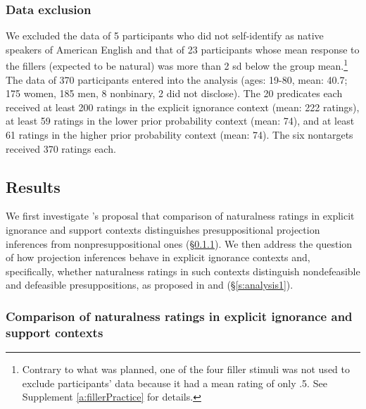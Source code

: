 \documentclass[11pt,fleqn]{article}
\newcommand{\6}{\mbox{$[\hspace*{-.6mm}[$}}
\newcommand{\9}{\mbox{$]\hspace*{-.6mm}]$}}
\newcommand{\citepos}[1]{\citeauthor{#1}'s \citeyear{#1}}
\begin{document}
\subsubsection{Data exclusion} 

We excluded the data of 5 participants who did not self-identify as native speakers of American English and that of 23 participants whose mean response to the fillers (expected to be natural) was more than 2 sd below the group mean.\footnote{Contrary to what was planned, one of the four filler stimuli was not used to exclude participants' data because it had a mean rating of only .5. See Supplement \ref{a:fillerPractice} for details.} The data of 370 participants entered into the analysis (ages: 19-80, mean: 40.7; 175 women, 185 men, 8 nonbinary, 2 did not disclose). The 20 predicates each received at least 200 ratings in the explicit ignorance context (mean: 222 ratings), at least 59 ratings in the lower prior probability context (mean: 74), and at least 61 ratings in the higher prior probability context (mean: 74). The six nontargets received 370 ratings each. 

\subsection{Results}

We first investigate \citepos{mandelkern-etal2020} proposal that comparison of naturalness ratings in explicit ignorance and support contexts distinguishes presuppositional projection inferences from nonpresuppositional ones (\S\ref{s:analysis2}). We then address the question of how projection inferences behave in explicit ignorance contexts and, specifically, whether naturalness ratings in such contexts distinguish nondefeasible and defeasible presuppositions, as proposed in \citealt{simons01} and \citealt{abusch10} (\S\ref{s:analysis1}).

\subsubsection{Comparison of naturalness ratings in explicit ignorance and support contexts}\label{s:analysis2}
\end{document}
